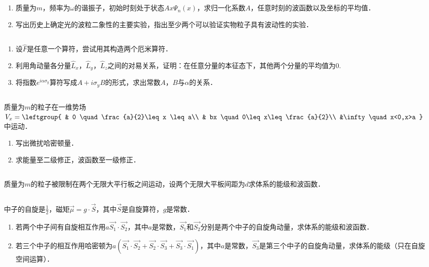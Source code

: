 
\subsection{ }
\begin{enumerate}
\item 质量为$m$，频率为$\omega$的谐振子，初始时刻处于状态$Ax\varPsi_{n}(x)$，求归一化系数$A$，任意时刻的波函数以及坐标的平均值．
\item 写出历史上确定光的波粒二象性的主要实验，指出至少两个可以验证实物粒子具有波动性的实验．
\end{enumerate}
\subsection{ }
\begin{enumerate}
\item 设$\hat{F}$是任意一个算符，尝试用其构造两个厄米算符．
\item 利用角动量各分量$\hat{L}_{x}$，$\hat{L}_{y}$，$\hat{L}_{z}$之间的对易关系，证明：在任意分量的本征态下，其他两个分量的平均值为0.
\item 将指数$e^{i\alpha \sigma_{y}}$算符写成$A+i\sigma_{y}B$的形式，求出常数$A$，$B$与$\alpha$的关系．
\end{enumerate}
\subsection{ }
质量为$m$的粒子在一维势场$V_{x}=\leftgroup{
    & 0 \quad \frac{a}{2}\leq x \leq a\\
    & bx \quad 0\leq x\leq\frac{a}{2}\\
    &\infty \quad x<0,x>a
    }$中运动．
\begin{enumerate}
\item 写出微扰哈密顿量．
\item 求能量至二级修正，波函数至一级修正．
\end{enumerate}
\subsection{ }
质量为$m$的粒子被限制在两个无限大平行板之间运动，设两个无限大平板间距为$d$求体系的能级和波函数．
\subsection{ }
中子的自旋是$\frac{1}{2}$，磁矩$\vec{\mu}=g\cdot\vec{S}$，其中$\vec{S}$是自旋算符，$g$是常数．
\begin{enumerate}
\item 若两个中子间有自旋相互作用$a\vec{S_1}\cdot\vec{S_2}$，其中$a$是常数，$\vec{S_1}$和$\vec{S_2}$分别是两个中子的自旋角动量，求体系的能级和波函数．
\item 若三个中子的相互作用哈密顿为$a(\vec{S_{1}}\cdot\vec{S_{2}}+\vec{S_{2}}\cdot\vec{S_{3}}+\vec{S_{3}}\cdot\vec{S_{1}})$，其中$a$是常数，$\vec{S_{3}}$是第三个中子的自旋角动量，求体系的能级（只在自旋空间运算）．
\end{enumerate}